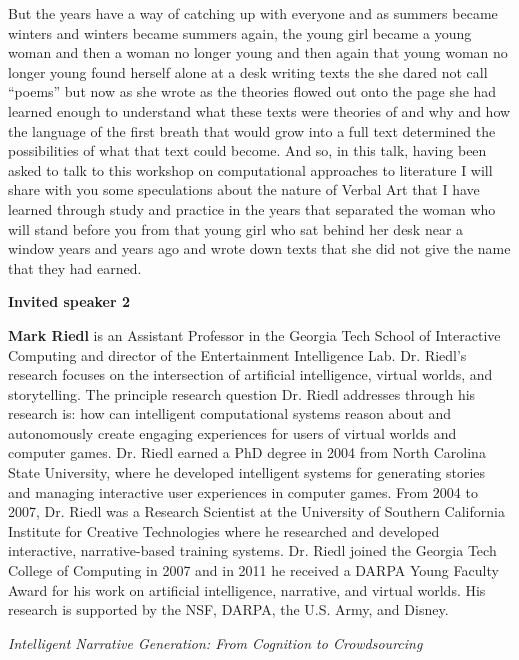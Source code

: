 But the years have a way of catching up with everyone and as summers became winters and winters became summers again, the young girl became a young woman and then a woman no longer young and then again that young woman no longer young found herself alone at a desk writing texts the she dared not call “poems” but now as she wrote as the theories flowed out onto the page she had learned enough to understand what these texts were theories of and why and how the language of the first breath that would grow into a full text determined the possibilities of what that text could become.  And so, in this talk, having been asked to talk to this workshop on computational approaches to literature I will share with you some speculations about the nature of Verbal Art that I have learned through study and practice in the years that separated the woman who will stand before you from that young girl who sat behind her desk near a window years and years ago and wrote down texts that she did not give the name that they had earned. 

\newpage

\begin{center}
{\large \bf Invited speaker 2}
\end{center}

{\bf Mark Riedl} is an Assistant Professor in the Georgia Tech School of Interactive Computing and director of the Entertainment Intelligence Lab. Dr. Riedl's research focuses on the intersection of artificial intelligence, virtual worlds, and storytelling. The principle research question Dr. Riedl addresses through his research is: how can intelligent computational systems reason about and autonomously create engaging experiences for users of virtual worlds and computer games. Dr. Riedl earned a PhD degree in 2004 from North Carolina State University, where he developed intelligent systems for generating stories and managing interactive user experiences in computer games. From 2004 to 2007, Dr. Riedl was a Research Scientist at the University of Southern California Institute for Creative Technologies where he researched and developed interactive, narrative-based training systems. Dr. Riedl joined the Georgia Tech College of Computing in 2007 and in 2011 he received a DARPA Young Faculty Award for his work on artificial intelligence, narrative, and virtual worlds. His research is supported by the NSF, DARPA, the U.S. Army, and Disney.

\begin{center}
{\Large \em Intelligent Narrative Generation: From Cognition to Crowdsourcing}
\end{center}

